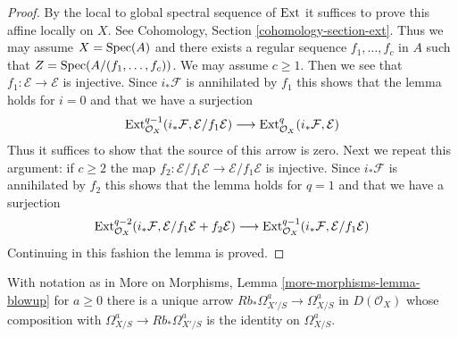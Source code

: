 \begin{proof}
By the local to global spectral sequence of $\mathop{\mathrm{Ext}}\nolimits$ it suffices
to prove this affine locally on $X$. See
Cohomology, Section \ref{cohomology-section-ext}.
Thus we may assume $X = \mathop{\mathrm{Spec}}(A)$
and there exists a regular sequence $f_1, \ldots, f_c$ in $A$
such that $Z = \mathop{\mathrm{Spec}}(A/(f_1, \ldots, f_c))$. We may assume $c \geq 1$.
Then we see that $f_1 : \mathcal{E} \to \mathcal{E}$
is injective. Since $i_*\mathcal{F}$ is annihilated by $f_1$
this shows that the lemma holds for $i = 0$ and that we have
a surjection
$$
\mathop{\mathrm{Ext}}\nolimits^{q - 1}_{\mathcal{O}_X}(i_*\mathcal{F}, \mathcal{E}/f_1\mathcal{E})
\longrightarrow
\mathop{\mathrm{Ext}}\nolimits^q_{\mathcal{O}_X}(i_*\mathcal{F}, \mathcal{E})
$$
Thus it suffices to show that the source of this arrow is zero.
Next we repeat this argument: if $c \geq 2$ the map
$f_2 : \mathcal{E}/f_1\mathcal{E} \to \mathcal{E}/f_1\mathcal{E}$
is injective. Since $i_*\mathcal{F}$ is annihilated by $f_2$
this shows that the lemma holds for $q = 1$ and that we have a
surjection
$$
\mathop{\mathrm{Ext}}\nolimits^{q - 2}_{\mathcal{O}_X}(i_*\mathcal{F},
\mathcal{E}/f_1\mathcal{E} + f_2\mathcal{E})
\longrightarrow
\mathop{\mathrm{Ext}}\nolimits^{q - 1}_{\mathcal{O}_X}(i_*\mathcal{F}, \mathcal{E}/f_1\mathcal{E})
$$
Continuing in this fashion the lemma is proved.
\end{proof}

\begin{lemma}
\label{lemma-splitting-on-omega-a}
With notation as in More on Morphisms, Lemma \ref{more-morphisms-lemma-blowup}
for $a \geq 0$ there is a unique arrow
$Rb_*\Omega^a_{X'/S} \to \Omega^a_{X/S}$ in $D(\mathcal{O}_X)$
whose composition with $\Omega^a_{X/S} \to Rb_*\Omega^a_{X'/S}$
is the identity on $\Omega^a_{X/S}$.
\end{lemma}

